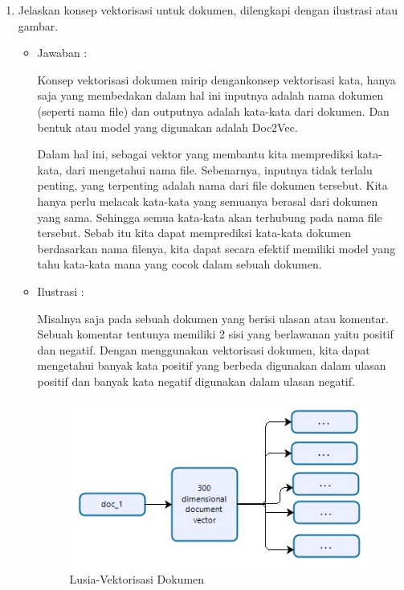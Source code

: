 \begin{enumerate}
\item Jelaskan konsep vektorisasi untuk dokumen, dilengkapi dengan ilustrasi atau
gambar.
	\begin{itemize}
	\item Jawaban :
		\par Konsep vektorisasi dokumen mirip dengankonsep vektorisasi kata, hanya saja yang membedakan dalam hal ini inputnya adalah nama dokumen (seperti nama file) dan outputnya adalah kata-kata dari dokumen. Dan bentuk atau model yang digunakan adalah Doc2Vec.
		\par Dalam hal ini, sebagai vektor yang membantu kita memprediksi kata-kata, dari mengetahui nama file. Sebenarnya, inputnya tidak terlalu penting, yang terpenting adalah nama dari file dokumen tersebut. Kita hanya perlu melacak kata-kata yang semuanya berasal dari dokumen yang sama. Sehingga semua kata-kata akan terhubung pada nama file tersebut. Sebab itu kita dapat memprediksi kata-kata dokumen berdasarkan nama filenya, kita dapat secara efektif memiliki model yang tahu kata-kata mana yang cocok dalam sebuah dokumen. 
	\item Ilustrasi :
		\par Misalnya saja pada sebuah dokumen yang berisi ulasan atau komentar. Sebuah komentar tentunya memiliki 2 sisi yang berlawanan yaitu positif dan negatif. Dengan menggunakan vektorisasi dokumen, kita dapat mengetahui banyak kata positif yang berbeda digunakan dalam ulasan positif dan banyak kata negatif digunakan dalam ulasan negatif.
			\begin{figure}[ht]
			\centering
			\includegraphics[scale=0.5]{figures/p4.jpg}
			\caption{Lusia-Vektorisasi Dokumen}
			\label{contoh}
			\end{figure}
	\end{itemize}


\end{enumerate}
